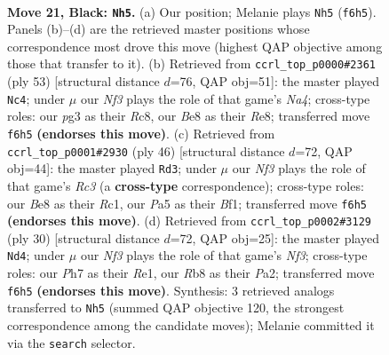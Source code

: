 \documentclass[11pt]{article}
\begin{document}
\clearpage

\begin{figure}[p]\centering
\begin{subfigure}{0.46\textwidth}\centering
\resizebox{\linewidth}{!}{%
\newchessgame
\chessboard[
  setfen={rr1qb1k1/p4ppp/B4n2/p2p4/3Q3P/1P3NP1/P4P2/R3R1K1 b - - 3 21},
  showmover=false,
  pgfstyle=straightmove, color=movearrow, markmove={f6-h5}
]}
\caption{}
\end{subfigure}\hfill
\begin{subfigure}{0.46\textwidth}\centering
\resizebox{\linewidth}{!}{%
\newchessgame
\chessboard[
  setfen={2r1r1k1/1p2q1pp/pQ2pn2/n2p4/3P4/3N1P1P/PP4PB/R3R1K1 b - - 2 27},
  showmover=false,
  pgfstyle=straightmove, color=movearrow, markmove={a5-c4}
]}
\caption{}
\end{subfigure}
\\[4pt]
\begin{subfigure}{0.46\textwidth}\centering
\resizebox{\linewidth}{!}{%
\newchessgame
\chessboard[
  setfen={br1r2k1/3n1p2/p4qp1/2pp3p/7P/PPR1PN2/3Q1PP1/2R2BK1 w - - 1 24},
  showmover=false,
  pgfstyle=straightmove, color=movearrow, markmove={c3-d3}
]}
\caption{}
\end{subfigure}\hfill
\begin{subfigure}{0.46\textwidth}\centering
\resizebox{\linewidth}{!}{%
\newchessgame
\chessboard[
  setfen={2r2kr1/pbqn1p1p/1p2p1p1/8/2P5/2Q2N2/P2PBPPP/R3R1K1 w - - 7 16},
  showmover=false,
  pgfstyle=straightmove, color=movearrow, markmove={f3-d4}
]}
\caption{}
\end{subfigure}
\caption{\textbf{Move 21, Black: \texttt{Nh5}.} (a) Our position; Melanie plays \texttt{Nh5} (\texttt{f6h5}). Panels (b)--(d) are the retrieved master positions whose correspondence most drove this move (highest QAP objective among those that transfer to it). (b) Retrieved from \texttt{ccrl\_top\_p0000\#2361} (ply 53) [structural distance $d$=76, QAP obj=51]: the master played \texttt{Nc4}; under $\mu$ our \emph{Nf3} plays the role of that game's \emph{Na4}; cross-type roles: our \emph{p}g3 as their \emph{R}c8, our \emph{B}e8 as their \emph{R}e8; transferred move \texttt{f6h5} \textbf{(endorses this move)}. (c) Retrieved from \texttt{ccrl\_top\_p0001\#2930} (ply 46) [structural distance $d$=72, QAP obj=44]: the master played \texttt{Rd3}; under $\mu$ our \emph{Nf3} plays the role of that game's \emph{Rc3} (a \textbf{cross-type} correspondence); cross-type roles: our \emph{B}e8 as their \emph{R}c1, our \emph{P}a5 as their \emph{B}f1; transferred move \texttt{f6h5} \textbf{(endorses this move)}. (d) Retrieved from \texttt{ccrl\_top\_p0002\#3129} (ply 30) [structural distance $d$=72, QAP obj=25]: the master played \texttt{Nd4}; under $\mu$ our \emph{Nf3} plays the role of that game's \emph{Nf3}; cross-type roles: our \emph{P}h7 as their \emph{R}e1, our \emph{R}b8 as their \emph{P}a2; transferred move \texttt{f6h5} \textbf{(endorses this move)}. Synthesis: 3 retrieved analogs transferred to \texttt{Nh5} (summed QAP objective 120, the strongest correspondence among the candidate moves); Melanie committed it via the \texttt{search} selector.}
\label{fig:thought-m41}
\end{figure}
\end{document}
